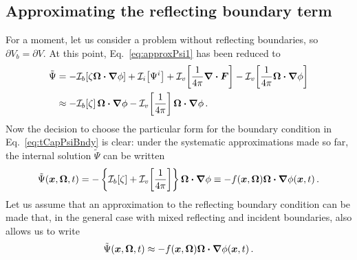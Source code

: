 \subsection{Approximating the reflecting boundary term}\label{sec:derReflBc}
For a moment, let us consider a problem without reflecting boundaries, so
$\partial V_b = \partial V$. At this point, Eq.~\eqref{eq:approxPsi1} has been
reduced to
\begin{align*}
  \tilde\Psi
  &= -\mathcal{I}_{b}\!\left[\zeta \bm{\Omega}\bm{\cdot} \bm{\nabla} \phi\right]
    + \mathcal{I}_{i}\!\left[\Psi^i\right]
    + \mathcal{I}_{v}\!\left[\frac{1}{4\pi} \bm{\nabla} \bm{\cdot}\bm{F} \right]
    - \mathcal{I}_{v}\!\left[\frac{1}{4\pi} \bm{\Omega}\bm{\cdot} \bm{\nabla} \phi\right]
\\
  &\approx
  -\mathcal{I}_{b}\!\left[\zeta\right] \bm{\Omega}\bm{\cdot} \bm{\nabla} \phi
  - \mathcal{I}_{v}\!\left[\frac{1}{4\pi}\right] \bm{\Omega}\bm{\cdot} \bm{\nabla} \phi \,.
\end{align*}
Now the decision to choose the particular form for the boundary condition in
Eq.~\eqref{eq:tCapPsiBndy}
is clear: under the systematic approximations made so far, the internal solution
$\tilde\Psi$ can be written
\begin{equation*}
  \tilde\Psi(\bm{x}, \bm{\Omega}, t)
  = - \left\{ \mathcal{I}_{b}\!\left[\zeta\right] + \mathcal{I}_{v}\!\left[\frac{1}{4\pi}\right]
  \right\} \bm{\Omega}\bm{\cdot} \bm{\nabla} \phi
  \equiv - f(\bm{x}, \bm{\Omega}) \bm{\Omega}\bm{\cdot} \bm{\nabla} \phi(\bm{x}, t)\,.
\end{equation*}
Let us assume that an approximation to the reflecting boundary condition can
be made that, in the general case with mixed reflecting and incident
boundaries, also allows us to write 
\begin{equation*}
  \tilde\Psi(\bm{x}, \bm{\Omega}, t)
  \approx - f(\bm{x}, \bm{\Omega}) \bm{\Omega}\bm{\cdot} \bm{\nabla} \phi(\bm{x}, t)\,.
\end{equation*}

